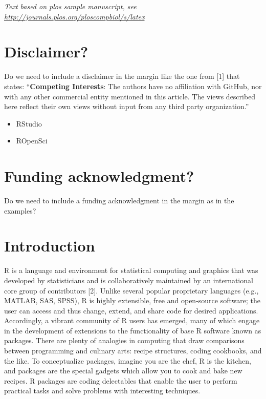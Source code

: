 \documentclass[10pt,letterpaper]{article}
\providecommand{\tightlist}{%
  \setlength{\itemsep}{0pt}\setlength{\parskip}{0pt}}
\begin{document}
\linenumbers

\emph{Text based on plos sample manuscript, see
\url{http://journals.plos.org/ploscompbiol/s/latex}}

\hypertarget{disclaimer}{%
\section{Disclaimer?}\label{disclaimer}}

Do we need to include a disclaimer in the margin like the one from
{[}1{]} that states: ``\textbf{Competing Interests}: The authors have no
affiliation with GitHub, nor with any other commercial entity mentioned
in this article. The views described here reflect their own views
without input from any third party organization.''

\begin{itemize}
\tightlist
\item
  RStudio
\item
  ROpenSci
\end{itemize}

\hypertarget{funding-acknowledgment}{%
\section{Funding acknowledgment?}\label{funding-acknowledgment}}

Do we need to include a funding acknowledgment in the margin as in the
examples?

\hypertarget{introduction}{%
\section{Introduction}\label{introduction}}

R is a language and environment for statistical computing and graphics
that was developed by statisticians and is collaboratively maintained by
an international core group of contributors {[}2{]}. Unlike several
popular proprietary languages (e.g., MATLAB, SAS, SPSS), R is highly
extensible, free and open-source software; the user can access and thus
change, extend, and share code for desired applications. Accordingly, a
vibrant community of R users has emerged, many of which engage in the
development of extensions to the functionality of base R software known
as packages. There are plenty of analogies in computing that draw
comparisons between programming and culinary arts: recipe structures,
coding cookbooks, and the like. To conceptualize packages, imagine you
are the chef, R is the kitchen, and packages are the special gadgets
which allow you to cook and bake new recipes. R packages are coding
delectables that enable the user to perform practical tasks and solve
problems with interesting techniques.
\end{document}
